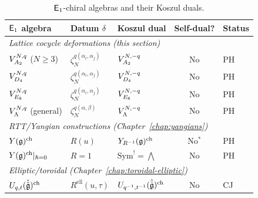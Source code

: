 \begin{table}[ht]
\centering
\caption{$\mathsf{E}_1$-chiral algebras and their Koszul duals.}
\label{tab:lattice:e1-catalog}
\renewcommand{\arraystretch}{1.4}
{\small
\begin{tabular}{l l l c l}
\textbf{$\mathsf{E}_1$ algebra} & \textbf{Datum $\delta$}
  & \textbf{Koszul dual}
  & \textbf{Self-dual?}
  & \textbf{Status} \\
\hline
\multicolumn{5}{l}{\textit{Lattice cocycle deformations
  \textup{(}this section\textup{)}}} \\
\hline
$V_{A_2}^{N,q}$ ($N \geq 3$)
  & $\zeta_N^{q(\alpha_i,\alpha_j)}$
  & $V_{A_2}^{N,-q}$
  & No & PH \\
$V_{D_4}^{N,q}$
  & $\zeta_N^{q(\alpha_i,\alpha_j)}$
  & $V_{D_4}^{N,-q}$
  & No & PH \\
$V_{E_8}^{N,q}$
  & $\zeta_N^{q(\alpha_i,\alpha_j)}$
  & $V_{E_8}^{N,-q}$
  & No & PH \\
$V_\Lambda^{N,q}$ (general)
  & $\zeta_N^{q(\alpha,\beta)}$
  & $V_\Lambda^{N,-q}$
  & No & PH \\
\hline
\multicolumn{5}{l}{\textit{RTT/Yangian constructions
  \textup{(}Chapter~\ref{chap:yangians}\textup{)}}} \\
\hline
$Y(\mathfrak{g})^{\mathrm{ch}}$
  & $R(u)$
  & $Y_{R^{-1}}(\mathfrak{g})^{\mathrm{ch}}$
  & No$^*$ & PH \\
$Y(\mathfrak{g})^{\mathrm{ch}}|_{\hbar=0}$
  & $R = 1$
  & $\mathrm{Sym}^! = \bigwedge$
  & No & PH \\
\hline
\multicolumn{5}{l}{\textit{Elliptic/toroidal
  \textup{(}Chapter~\ref{chap:toroidal-elliptic}\textup{)}}} \\
\hline
$U_{q,t}(\hat{\hat{\mathfrak{g}}})^{\mathrm{ch}}$
  & $R^{\mathrm{ell}}(u,\tau)$
  & $U_{q^{-1},t^{-1}}(\hat{\hat{\mathfrak{g}}})^{\mathrm{ch}}$
  & No & CJ \\
\end{tabular}
}
\smallskip

\end{table}

